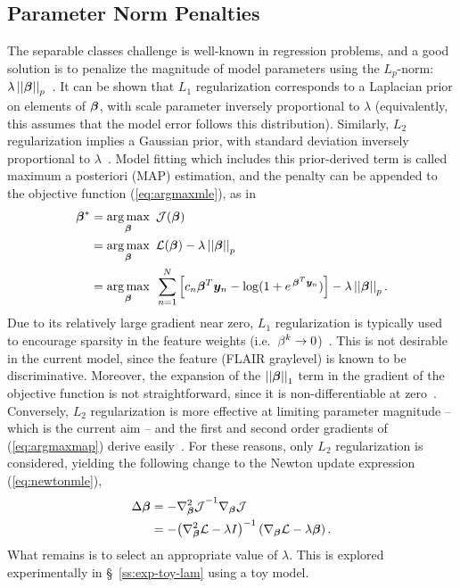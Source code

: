 \subsection{Parameter Norm Penalties}\label{ss:vlr-reg-lambda}
The separable classes challenge is well-known in regression problems,
and a good solution is to penalize the magnitude of model parameters using the $L_p$-norm:
$\lambda\left|\left|\bm{\beta}\right|\right|_p$~\cite{Zou2005}.
It can be shown that $L_1$ regularization corresponds to a Laplacian prior on elements of $\bm{\beta}$,
with scale parameter inversely proportional to $\lambda$
(equivalently, this assumes that the model error follows this distribution).
Similarly, $L_2$ regularization implies a Gaussian prior,
with standard deviation inversely proportional to $\lambda$~\cite{Zou2005}.
Model fitting which includes this prior-derived term is called
maximum a posteriori (MAP) estimation,
and the penalty can be appended to the objective function (\ref{eq:argmaxmle}), as in
\begin{align}
  \bb^* &= \underset{\bb}{\arg\max}\en\J(\bb) \nonumber\\
        &= \underset{\bb}{\arg\max}\en\L(\bb) - \lambda\norm{\bb}_p \nonumber\\
        &= \underset{\bb}{\arg\max}\en\sum_{n=1}^{N}
           \Big[ c_n \bb^T\by_n - \log (1+e^{\et\bb^T\by_n}) \Big] - \lambda\norm{\bb}_p.%
  \label{eq:argmaxmap}
\end{align}
Due to its relatively large gradient near zero,
$L_1$ regularization is typically used to encourage sparsity in the feature weights
(i.e.\ $\beta^k\rightarrow0$)~\cite{Tibshirani1996}.
This is not desirable in the current model,
since the feature (FLAIR graylevel) is known to be discriminative.
Moreover, the expansion of the $\left|\left|\bm{\beta}\right|\right|_1$ term
in the gradient of the objective function is not straightforward,
since it is non-differentiable at zero~\cite{Tibshirani1996,Lee2006}.
Conversely, $L_2$ regularization is more effective at limiting parameter magnitude
-- which is the current aim --
and the first and second order gradients of (\ref{eq:argmaxmap}) derive easily~\cite{Minka2003}.
For these reasons, only $L_2$ regularization is considered,
yielding the following change to the Newton update expression (\ref{eq:newtonmle}),
\begin{align}
  \Delta\bb&=-{\nabla^2_{\bb}\J}^{-1}\nabla_{\bb}\J \nonumber\\
           &=-{\left(\nabla^2_{\bb}\L-\lambda I\right)}^{-1}\left(\nabla_{\bb}\L-\lambda\bb\right).%
  \label{eq:newtonmap}
\end{align}
What remains is to select an appropriate value of $\lambda$.
This is explored experimentally in \S~\ref{ss:exp-toy-lam} using a toy model.
